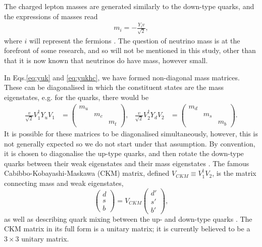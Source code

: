 \documentclass[a4paper,12pt]{article}
\begin{document}
The charged lepton masses are generated similarly to the down-type quarks, and the expressions of masses read
\begin{align}
    \label{eq:fermas}
    m_i = -\frac{Y_iv}{\sqrt{2}},
\end{align}
where $i$ will represent the fermions \cite{schwartz}. 
The question of neutrino mass is at the forefront of some research, and so will not be mentioned in this study, other than that it is now known that neutrinos do have mass, however small. 

In Eqs.\eqref{eq:yuk} and \eqref{eq:yukhc}, we have formed non-diagonal mass matrices. 
These can be diagonalised in which the constituent states are the mass eigenstates, e.g. for the quarks, there would be 
\begin{align}
    \label{eq:massmat}
    \frac{v}{\sqrt{2}}V_1^\dagger Y_uV_1 &= \begin{pmatrix} m_u & & \\ & m_c & \\ & & m_t\end{pmatrix}, & \frac{v}{\sqrt{2}}V_2^\dagger Y_dV_2 &= \begin{pmatrix} m_d & & \\ & m_s & \\ & & m_b\end{pmatrix}.
\end{align}
It is possible for these matrices to be diagonalised simultaneously, however, this is not generally expected so we do not start under that assumption. 
By convention, it is chosen to diagonalise the up-type quarks, and then rotate the down-type quarks between their weak eigenstates and their mass eigenstates \cite{dono}. 
The famous Cabibbo-Kobayashi-Maskawa (CKM) matrix, defined $V_{CKM}\equiv V_1^\dagger V_2$, is the matrix connecting mass and weak eigenstates,
\begin{equation}
    \label{eq:ckmone}
    \begin{pmatrix} d \\ s \\ b\end{pmatrix} = V_{CKM}\begin{pmatrix} d' \\ s' \\ b'\end{pmatrix},
\end{equation}
as well as describing quark mixing between the up- and down-type quarks \cite{kobamask}. 
The CKM matrix in its full form is a unitary matrix; it is currently believed to be a $3\times3$ unitary matrix. 
\end{document}
